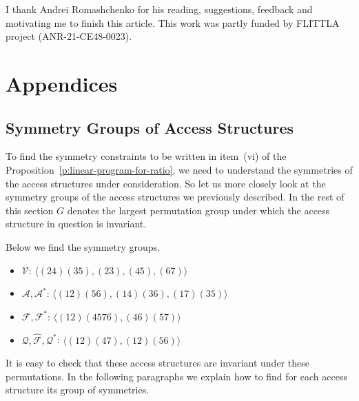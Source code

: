 \documentclass[11pt, a4paper]{kybernetika}
\begin{document}
	I thank Andrei Romashchenko for his reading, suggestions, feedback and motivating me to finish this article. This work was partly funded by FLITTLA project (ANR-21-CE48-0023).
	
	\printbibliography
	
	\section*{Appendices}
	\renewcommand{\thesubsection}{\Alph{subsection}}
	
	\subsection{Symmetry Groups of Access Structures}
	To find the symmetry constraints to be written in item~(vi) of the Proposition~\ref{p:linear-program-for-ratio}, we need to understand the symmetries of the access structures under consideration.
	So let us more closely look at the symmetry groups of the access structures we previously described.
	In the rest of this section $G$ denotes the largest permutation group under which the access structure in question is invariant.
	
	Below we find the symmetry groups.	
	
	\begin{itemize}
		\item $\mathcal{V}$: $\langle(24)(35),(23),(45),(67)\rangle$
		\item $\mathcal{A}, \mathcal{A}^*$: $\langle(12)(56),(14)(36),(17)(35)\rangle$
		\item $\mathcal{F}, \mathcal{F}^*$: $\langle(12)(4576),(46)(57)\rangle$
		\item $\mathcal{Q}, \widehat{\mathcal{F}}, \mathcal{Q}^*$: $\langle(12)(47),(12)(56)\rangle$
	\end{itemize}
	
	It is easy to check that these access structures are invariant under these permutations. In the following paragraphs we explain how to find for each access structure its group of symmetries.
	
\end{document}

